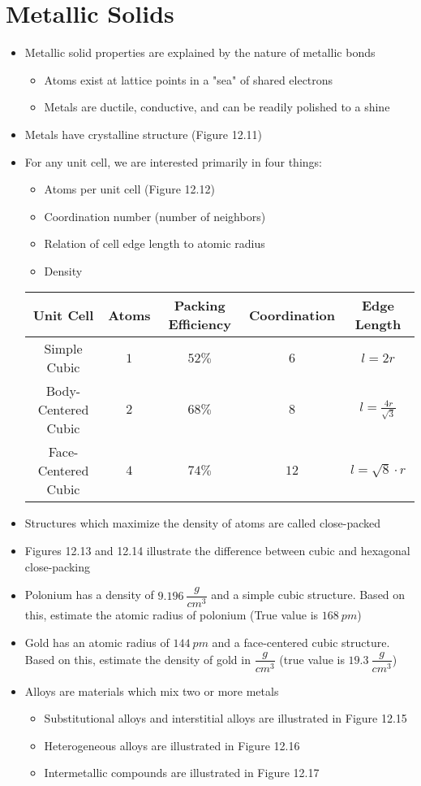 \documentclass[12pt, openany, letterpaper]{memoir}
\begin{document}
\section{Metallic Solids}
\begin{itemize}
  \item Metallic solid properties are explained by the nature of metallic bonds
  \begin{itemize}
    \item Atoms exist at lattice points in a "sea" of shared electrons
    \item Metals are ductile, conductive, and can be readily polished to a shine
  \end{itemize}
	\item Metals have crystalline structure (Figure 12.11)
  \item For any unit cell, we are interested primarily in four things:
	\begin{itemize}
		\item Atoms per unit cell (Figure 12.12)
		\item Coordination number (number of neighbors)
		\item Relation of cell edge length to atomic radius
		\item Density
	\end{itemize}
  \begin{tabular}{c|c|c|c|c}
    Unit Cell & Atoms & Packing Efficiency & Coordination & Edge Length \\ \midrule
    Simple Cubic & $1$ & $52\%$ & $6$ & $l=2r$\\ \midrule
    Body-Centered Cubic & $2$ &  $68\%$ & $8$ & $l=\frac{4r}{\sqrt{3}}$\\ \midrule
    Face-Centered Cubic & $4$ & $74\%$ & $12$ & $l=\sqrt{8}\cdot r$\\ 
  \end{tabular}
  \item Structures which maximize the density of atoms are called close-packed
  \item Figures 12.13 and 12.14 illustrate the difference between cubic and hexagonal close-packing
	\item Polonium has a density of $9.196~\dfrac{g}{cm^3}$ and a simple cubic structure. Based on this, estimate the atomic radius of polonium (True value is $168~pm$)
	\item Gold has an atomic radius of $144~pm$ and a face-centered cubic structure. Based on this, estimate the density of gold in $\dfrac{g}{cm^3}$ (true value is $19.3~\dfrac{g}{cm^3}$)
  \item Alloys are materials which mix two or more metals
  \begin{itemize}
    \item Substitutional alloys and interstitial alloys are illustrated in Figure 12.15
    \item Heterogeneous alloys are illustrated in Figure 12.16
    \item Intermetallic compounds are illustrated in Figure 12.17
  \end{itemize}
\end{itemize}
\end{document}
